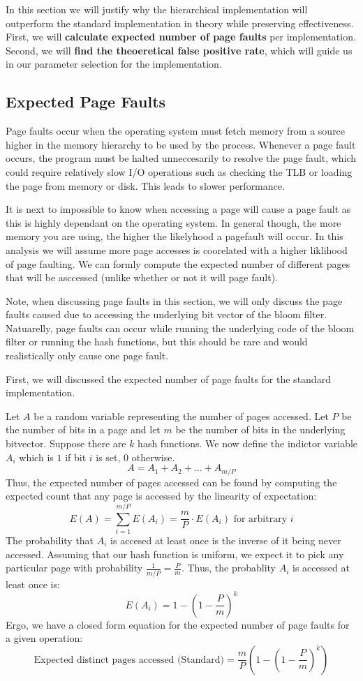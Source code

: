 In this section we will justify why the hierarchical implementation will outperform the standard implementation in theory while preserving effectiveness.
First, we will \textbf{calculate expected number of page faults} per implementation.
Second, we will \textbf{find the theoeretical false positive rate}, which will guide us in our parameter selection for the implementation.

\subsection{Expected Page Faults}
Page faults occur when the operating system must fetch memory from a source higher in the memory hierarchy to be used by the process.
Whenever a page fault occurs, the program must be halted unneccesarily to resolve the page fault, which could require relatively slow I/O operations such as checking the TLB or loading the page from memory or disk.
This leads to slower performance.

It is next to impossible to know when accessing a page will cause a page fault as this is highly dependant on the operating system.
In general though, the more memory you are using, the higher the likelyhood a pagefault will occur.
In this analysis we will assume more page accesses is coorelated with a higher liklihood of page faulting.
We can formly compute the expected number of different pages that will be asccessed (unlike whether or not it will page fault).

Note, when discussing page faults in this section, we will only discuss the page faults caused due to accessing the underlying bit vector of the bloom filter.
Natuarelly, page faults can occur while running the underlying code of the bloom filter or running the hash functions, but this should be rare and would realistically only cause one page fault.

First, we will discussed the expected number of page faults for the standard implementation.

Let $A$ be a random variable representing the number of pages accessed. 
Let $P$ be the number of bits in a page and let $m$ be the number of bits in the underlying bitvector.
Suppose there are $k$ hash functions.
We now define the indictor variable $A_i$ which is $1$ if bit $i$ is set, $0$ otherwise.
$$A = A_1 + A_2 + \ldots + A_{m/P}$$
Thus, the expected number of pages accessed can be found by computing the expected count that any page is accessed by the linearity of expectation:
$$E(A) = \sum_{i=1}^{m/P} E(A_i) = \frac{m}{P} \cdot E(A_i) \text{ for arbitrary $i$}$$
The probability that $A_i$ is accesed at least once is the inverse of it being never accessed.
Assuming that our hash function is uniform, we expect it to pick any particular page with probability $\frac{1}{m/P} = \frac{P}{m}$.
Thus, the probablity $A_i$ is accessed at least once is:
$$E(A_i)  = 1 - (1 - \frac{P}{m})^k$$
Ergo, we have a closed form equation for the expected number of page faults for a given operation:
$$\text{Expected distinct pages accessed (Standard)} = \frac{m}{P} (1 - (1 - \frac{P}{m})^k)$$

